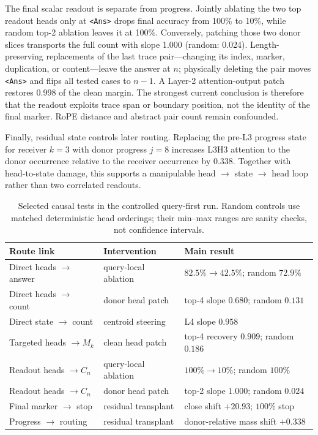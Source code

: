 \documentclass[11pt]{article}
\newcommand{\ans}{\texttt{<Ans>}}
\begin{document}
The final scalar readout is separate from progress. Jointly ablating the two top readout heads only at \ans{} drops final accuracy from 100\% to 10\%, while random top-2 ablation leaves it at 100\%. Conversely, patching those two donor slices transports the full count with slope 1.000 (random: 0.024). Length-preserving replacements of the last trace pair---changing its index, marker, duplication, or content---leave the answer at $n$; physically deleting the pair moves \ans{} and flips all tested cases to $n-1$. A Layer-2 attention-output patch restores 0.998 of the clean margin. The strongest current conclusion is therefore that the readout exploits trace span or boundary position, not the identity of the final marker. RoPE distance and abstract pair count remain confounded.

Finally, residual state controls later routing. Replacing the pre-L3 progress state for receiver $k=3$ with donor progress $j=8$ increases L3H3 attention to the donor occurrence relative to the receiver occurrence by 0.338. Together with head-to-state damage, this supports a manipulable head $\rightarrow$ state $\rightarrow$ head loop rather than two correlated readouts.

\begin{table}[t]
\caption{Selected causal tests in the controlled query-first run. Random controls use matched deterministic head orderings; their min--max ranges are sanity checks, not confidence intervals.}
\label{tab:causal}
\centering
\small
\begin{tabular}{p{1.32in}p{1.40in}p{1.62in}}
\toprule
Route link & Intervention & Main result \\
\midrule
Direct heads $\rightarrow$ answer & query-local ablation & $82.5\%\rightarrow42.5\%$; random $72.9\%$ \\
Direct heads $\rightarrow$ count & donor head patch & top-4 slope $0.680$; random $0.131$ \\
Direct state $\rightarrow$ count & centroid steering & L4 slope $0.958$ \\
Targeted heads $\rightarrow M_k$ & clean head patch & top-4 recovery $0.909$; random $0.186$ \\
Readout heads $\rightarrow C_n$ & query-local ablation & $100\%\rightarrow10\%$; random $100\%$ \\
Readout heads $\rightarrow C_n$ & donor head patch & top-2 slope $1.000$; random $0.024$ \\
Final marker $\rightarrow$ stop & residual transplant & close shift $+20.93$; $100\%$ stop \\
Progress $\rightarrow$ routing & residual transplant & donor-relative mass shift $+0.338$ \\
\bottomrule
\end{tabular}
\end{table}
\end{document}

